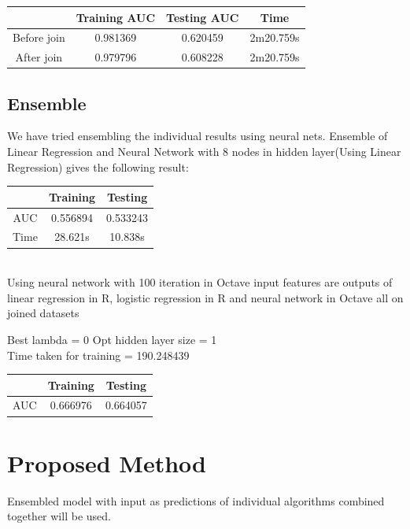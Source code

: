 \documentclass[10pt]{article}
\begin{document}
\begin{center}
 \begin{tabular}{|c | c | c | c||} 
 \hline
 & Training AUC & Testing AUC & Time\\ [0.5ex] 
 \hline\hline
Before join & 0.981369 & 0.620459 & 2m20.759s\\
 \hline
After join & 0.979796 & 0.608228 & 2m20.759s\\ 
 \hline
\end{tabular}
\end{center}

\subsection{Ensemble}
We have tried ensembling the individual results using neural nets. Ensemble of Linear Regression and Neural Network with 8 nodes in hidden layer(Using Linear Regression) gives the following result:\\

\begin{center}
 \begin{tabular}{|c | c | c||} 
 \hline
 & Training & Testing\\ [0.5ex] 
 \hline\hline
AUC & 0.556894 & 0.533243\\ 
 \hline
Time & 28.621s & 10.838s\\ 
 \hline
\end{tabular}
\end{center}

\\

Using neural network with 100 iteration in Octave
input features are outputs of linear regression in R, logistic regression in R and neural network in Octave all on joined datasets

	Best lambda = 0 Opt hidden layer size = 1 
\\
	Time taken for training = 190.248439
\\
\begin{center}
 \begin{tabular}{|c | c | c ||} 
 \hline
 & Training & Testing\\ [0.5ex] 
 \hline\hline
AUC & 0.666976 & 0.664057\\
 \hline
\end{tabular}
\end{center}

\section{Proposed Method}
Ensembled model with input as predictions of individual algorithms combined together will be used. 
\end{document}
